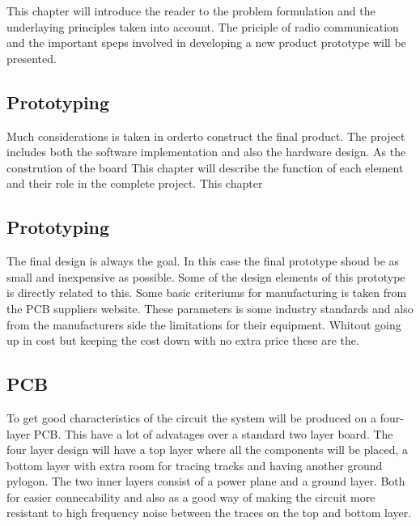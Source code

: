 This chapter will introduce the reader to the problem formulation and the underlaying principles taken into account. The priciple of radio communication and the important speps involved in developing a new product prototype will be presented.

\subsection{Prototyping}
Much considerations is taken in orderto construct the final product. The project includes both the software implementation and also the hardware design. As the constrution of the board 
This chapter will describe the function of each element and their role in the complete project. 
This chapter 



\subsection{Prototyping}
The final design is always the goal. In this case the final prototype shoud be as small and inexpensive as possible. Some of the design elements of this prototype is directly related to this. Some basic criteriums for manufacturing is taken from the PCB suppliers website. These parameters is some industry standards and also from the manufacturers side the limitations for their equipment. Whitout going up in cost but keeping the cost down with no extra price these are the.



\subsection{PCB}
To get good characteristics of the circuit the system will be produced on a four-layer PCB. This have a lot of advatages over a standard two layer board. The four layer design will have a top layer where all the components will be placed, a bottom layer with extra room for tracing tracks and having another ground pylogon. The two inner layers consist of a power plane and a ground layer. Both for easier connecability and also as a good way of making the circuit more resistant to high frequency noise between the traces on the top and bottom layer.



